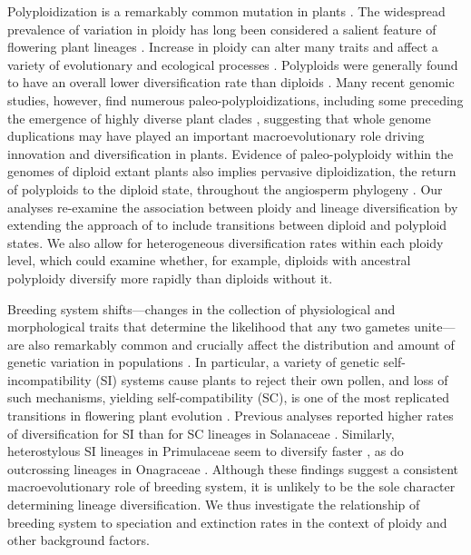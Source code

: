 Polyploidization is a remarkably common mutation in plants \citep{husband_2013, zenilferguson_2017}.
The widespread prevalence of variation in ploidy has long been considered a salient feature of flowering plant lineages \citep{stebbins1938}. 
Increase in ploidy can alter many traits and affect a variety of evolutionary and ecological processes \citep{ramsey_2002, sessa_2019}.
Polyploids were generally found to have an overall lower diversification rate than diploids \citep{mayrose_2011, mayrose_2015}. 
Many recent genomic studies, however, find numerous paleo-polyploidizations, including some preceding the emergence of highly diverse plant clades \citep{soltis_2014, landis_2018}, suggesting that whole genome duplications may have played an important macroevolutionary role driving innovation and diversification in plants. 
Evidence of paleo-polyploidy within the genomes of diploid extant plants also implies pervasive diploidization, the return of polyploids to the diploid state, throughout the angiosperm phylogeny \citep{soltis_2015, dodsworth_2015}.
Our analyses re-examine the association between ploidy and lineage diversification by extending the approach of \citet{mayrose_2011, mayrose_2015} to include transitions between diploid and polyploid states. 
We also allow for heterogeneous diversification rates within each ploidy level, which could examine whether, for example, diploids with ancestral polyploidy diversify more rapidly than diploids without it. 

Breeding system shifts---changes in the collection of physiological and morphological traits that determine the likelihood that any two gametes unite---are also remarkably common and crucially affect the distribution and amount of genetic variation in populations \citep{barrett2013}. %
In particular, a variety of genetic self-incompatibility (SI) systems cause plants to reject their own pollen, and loss of such mechanisms, yielding self-compatibility (SC), is one of the most replicated transitions in flowering plant evolution \citep{stebbins1974, igic_2008}.
Previous analyses reported higher rates of diversification for SI than for SC lineages in Solanaceae \citep{goldberg_2010}. 
Similarly, heterostylous SI lineages in Primulaceae seem to diversify faster \citep{devos2014}, as do outcrossing lineages in Onagraceae \citep{freyman_2019}.
Although these findings suggest a consistent macroevolutionary role of breeding system, it is unlikely to be the sole character determining lineage diversification.
We thus investigate the relationship of breeding system to speciation and extinction rates in the context of ploidy and other background factors.

